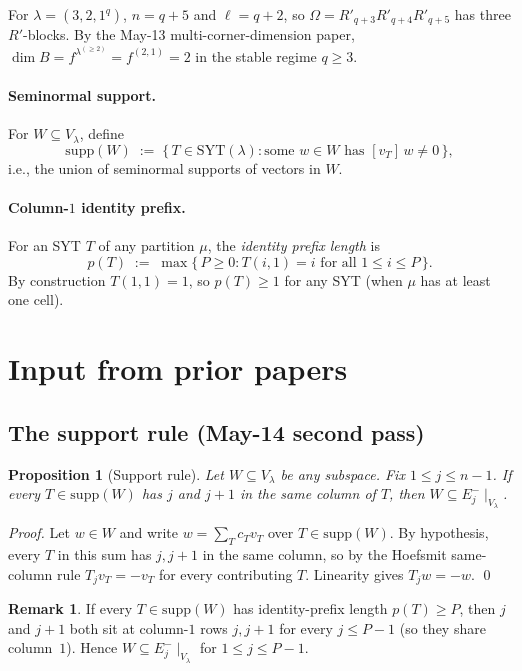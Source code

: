\documentclass[11pt]{article}
\newtheorem{proposition}[theorem]{Proposition}
\theoremstyle{definition}
\newtheorem{remark}[theorem]{Remark}
\newcommand{\Om}{\Omega}
\newcommand{\supp}{\mathrm{supp}}
\newcommand{\SYT}{\mathrm{SYT}}
\begin{document}
For $\lambda = (3,2,1^q)$, $n = q+5$ and $\ell = q+2$, so
$\Om = R'_{q+3}R'_{q+4}R'_{q+5}$ has three $R'$-blocks.  By the
May-13 multi-corner-dimension paper, $\dim B = f^{\lambda^{(\ge 2)}}
= f^{(2,1)} = 2$ in the stable regime $q \ge 3$.

\paragraph{Seminormal support.}  For $W \subseteq V_\lambda$, define
\[
   \supp(W) \;:=\; \{\,T \in \SYT(\lambda) : \text{some } w \in W
   \text{ has } [v_T]\,w \ne 0\,\},
\]
i.e., the union of seminormal supports of vectors in $W$.

\paragraph{Column-$1$ identity prefix.}  For an SYT $T$ of any
partition $\mu$, the \emph{identity prefix length} is
\[
   p(T) \;:=\; \max\{\,P \ge 0 : T(i, 1) = i \text{ for all }
   1 \le i \le P\,\}.
\]
By construction $T(1,1) = 1$, so $p(T) \ge 1$ for any SYT (when
$\mu$ has at least one cell).

\section{Input from prior papers}\label{sec:input}

\subsection{The support rule (May-14 second pass)}

\begin{proposition}[Support rule]\label{prop:support-rule}
Let $W \subseteq V_\lambda$ be any subspace.  Fix $1 \le j \le n-1$.
If every $T \in \supp(W)$ has $j$ and $j+1$ in the same column of
$T$, then $W \subseteq E_j^-\!\mid_{V_\lambda}$.
\end{proposition}

\begin{proof}
Let $w \in W$ and write $w = \sum_T c_T v_T$ over $T \in \supp(W)$.
By hypothesis, every $T$ in this sum has $j, j+1$ in the same column,
so by the Hoefsmit same-column rule $T_j v_T = -v_T$ for every
contributing $T$.  Linearity gives $T_j w = -w$.
\qed
\end{proof}

\begin{remark}\label{rem:prefix-implies-Ej-}
If every $T \in \supp(W)$ has identity-prefix length $p(T) \ge P$,
then $j$ and $j+1$ both sit at column-$1$ rows $j, j+1$ for every
$j \le P-1$ (so they share column~$1$).  Hence
$W \subseteq E_j^-\!\mid_{V_\lambda}$ for $1 \le j \le P - 1$.
\end{remark}
\end{document}
